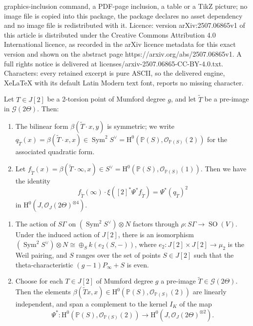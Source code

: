 \documentclass[10pt,a4paper]{amsart}
\DeclareMathOperator{\SO}{SO}
\DeclareMathOperator{\Sym}{Sym}
\newcommand{\HH}{\mathrm{H}}
\newcommand{\cO}{\mathcal{O}}
\renewcommand{\O}{\mathcal{O}}
\renewcommand{\P}{\mathbb{P}}
\begin{document}
graphics-inclusion command, a PDF-page inclusion, a table or a TikZ picture; no image file is copied into this package, the package declares no asset dependency and no image file is redistributed with it. Licence: version arXiv:2507.06865v1 of this article is distributed under the Creative Commons Attribution 4.0 International licence, as recorded in the arXiv licence metadata for this exact version and shown on the abstract page https://arxiv.org/abs/2507.06865v1. A full rights notice is delivered at licenses/arxiv-2507.06865-CC-BY-4.0.txt. Characters: every retained excerpt is pure ASCII, so the delivered engine, XeLaTeX with its default Latin Modern text font, reports no missing character.
\begin{proposition}\label{prop_Riemann_theta_relation_as_incidence_relation}
    Let $T \in J[2]$ be a 2-torsion point of Mumford degree $g$, and let ${\widetilde{T}}$ be a pre-image in $\mathcal{G}(2 \Theta)$. Then:
    \begin{enumerate}
        \item The bilinear form $\beta( \widetilde{T} \cdot x, y)$ is symmetric; we write $q_{\widetilde{T}}(x) = \beta( \widetilde{T} \cdot x,x) \in \Sym^2 S^\vee =\HH^0(\P(S), \cO_{\P(S)}(2))$ for the associated quadratic form.
        \item Let $f_{\widetilde{T}}(x) = \beta(\widetilde{T} \cdot \infty,x) \in S^\vee =\HH^0(
        \P(S), \cO_{\P(S)}(1))$. Then we have the identity
        \[ f_{\widetilde{T}}(\infty) \cdot \xi([2]^\ast \Psi^\ast f_{\widetilde{T}}) = \Psi^\ast(q_{\widetilde{T}})^2 \]
        in $\HH^0(J, \cO_J(2 \Theta)^{\otimes 4})$.
    \end{enumerate}
\end{proposition}

\begin{proposition}\label{prop_q_tildes_inject_to_Kummer}
    \begin{enumerate}
        \item The action of $S \Gamma$ on $(\Sym^2 S^\vee) \otimes N$ factors through $\rho : S \Gamma \to \SO(V)$. Under the induced action of $J[2]$, there is an isomorphism $(\Sym^2 S^\vee) \otimes N \cong \oplus_S k(e_2(S, -))$, where $e_2 : J[2] \times J[2] \to \mu_2$ is the Weil pairing, and $S$ ranges over the set of points $S \in J[2]$ such that the theta-characteristic $(g-1) P_\infty + S$ is even. 
        \item Choose for each $T \in J[2]$ of Mumford degree $g$ a pre-image $\widetilde{T} \in \mathcal{G}(2 \Theta)$. Then the elements $\beta(\widetilde{T} x,x) \in\HH^0(\P(S), \cO_{\P(S)}(2))$ are linearly independent, and span a complement to the kernel $I_K$ of the map
        \[ \Psi^\ast :\HH^0(\P(S), \cO_{\P(S)}(2)) \to\HH^0(J, \O_J(2 \Theta)^{\otimes 2}). \]
    \end{enumerate}
\end{proposition}
\end{document}
